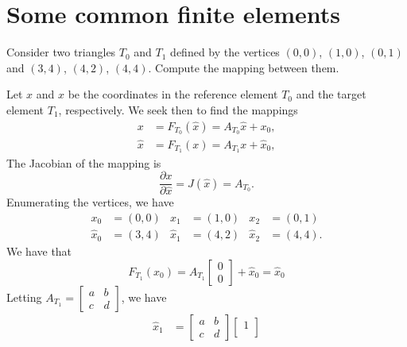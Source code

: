 \section{Some common finite elements}

\begin{exercise}
    Consider two triangles $T_{0}$ and $T_{1}$ defined by the vertices $(0, 0)$, $(1, 0)$, $(0, 1)$ and $(3, 4)$, $(4, 2)$, $(4, 4)$.
    Compute the mapping between them.
\end{exercise}

\begin{solution}
    Let $x$ and $\hat{x}$ be the coordinates in the reference element $T_{0}$ and the target element $T_{1}$, respectively.
    We seek then to find the mappings
    \begin{align*}
        x &= F_{T_{0}}(\hat{x}) = A_{T_{0}} \hat{x} + x_0, \\
        \hat{x} &= F_{T_{1}}(x) = A_{T_{1}} x + \hat{x}_0,
    \end{align*}
    The Jacobian of the mapping is
    \begin{equation}
        \frac{\partial x}{\partial \hat{x}} = J(\hat{x}) = A_{T_{0}}.
    \end{equation}
    Enumerating the vertices, we have
    \begin{align*}
        x_0 &= (0, 0) & x_1 &= (1, 0) & x_2 &= (0, 1) \\
        \hat{x}_0 &= (3, 4) & \hat{x}_1 &= (4, 2) & \hat{x}_2 &= (4, 4).
    \end{align*}
    We have that
    \begin{equation*}
        F_{T_1}(x_0) = A_{T_1}
        \begin{bmatrix}
            0 \\
            0
        \end{bmatrix}
        + \hat{x}_0 = \hat{x}_0
    \end{equation*}
    Letting $A_{T_1} =
    \begin{bmatrix}
        a & b \\
        c & d
    \end{bmatrix}$, we have
    \begin{align*}
        \hat{x}_1 &=
        \begin{bmatrix}
            a & b \\
            c & d
        \end{bmatrix}
        \begin{bmatrix}
            1 \\

\end{bmatrix}
\end{align*}
\end{solution}
